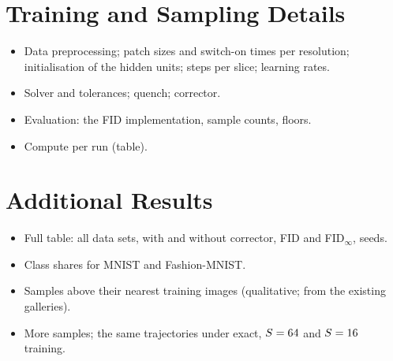 \documentclass{article}
\newenvironment{plan}
  {\begin{itemize}[leftmargin=1.1em,itemsep=1pt,topsep=2pt,parsep=0pt]\color{plancolor}}
  {\end{itemize}}
\begin{document}
\section{Training and Sampling Details}
\label{app:details}
\begin{plan}
  \item Data preprocessing; patch sizes and switch-on times per resolution;
        initialisation of the hidden units; steps per slice; learning rates.
  \item Solver and tolerances; quench; corrector.
  \item Evaluation: the FID implementation, sample counts, floors.
  \item Compute per run (table).
\end{plan}

\section{Additional Results}
\label{app:more-results}
\begin{plan}
  \item Full table: all data sets, with and without corrector, FID and
        FID$_\infty$, seeds.
  \item Class shares for MNIST and Fashion-MNIST.
  \item Samples above their nearest training images (qualitative; from the
        existing galleries).
  \item More samples; the same trajectories under exact, $S=64$ and
        $S=16$ training.
\end{plan}
\end{document}
